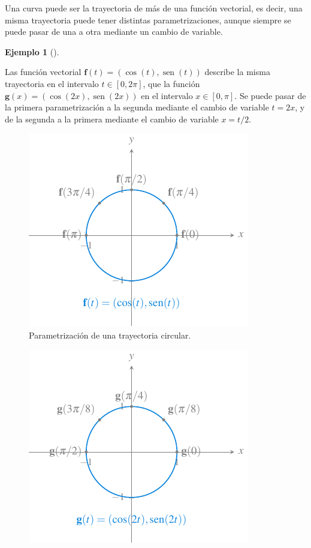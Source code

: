 \documentclass[
  a4paper,
]{scrreport}
\theoremstyle{definition}
\newtheorem{example}{Ejemplo}[chapter]
\theoremstyle{plain}
\theoremstyle{definition}
\theoremstyle{definition}
\theoremstyle{plain}
\theoremstyle{plain}
\theoremstyle{remark}
\begin{document}
Una curva puede ser la trayectoria de más de una función vectorial, es
decir, una misma trayectoria puede tener distintas parametrizaciones,
aunque siempre se puede pasar de una a otra mediante un cambio de
variable.

\begin{example}[]\protect\hypertarget{exm-parametrizacion-trayectorias}{}\label{exm-parametrizacion-trayectorias}

Las función vectorial \(\mathbf{f}(t)=(\cos(t), \operatorname{sen}(t))\)
describe la misma trayectoria en el intervalo \(t\in[0,2\pi]\), que la
función \(\mathbf{g}(x) = (\cos(2x), \operatorname{sen}(2x))\) en el
intervalo \(x\in[0,\pi]\). Se puede pasar de la primera parametrización
a la segunda mediante el cambio de variable \(t=2x\), y de la segunda a
la primera mediante el cambio de variable \(x=t/2\).

\begin{figure}[H]

{\centering \includegraphics{img/funciones-vectoriales/parametrizacion-trayectoria-circular.pdf}

}

\caption{Parametrización de una trayectoria circular.}

\end{figure}%

\begin{figure}[H]

{\centering \includegraphics{img/funciones-vectoriales/parametrizacion-trayectoria-circular-2.pdf}

}
\end{figure}
\end{example}
\end{document}
